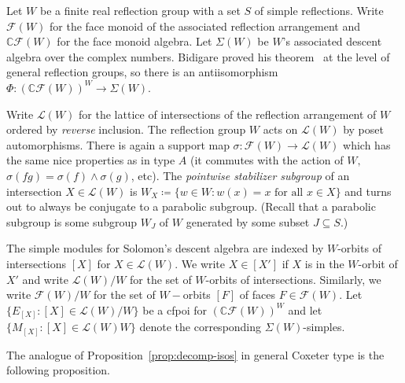 \documentclass[ALCO, Unicode]{cedram}
\def\C{{\mathbb{C}}}
\begin{document}
Let \textbf{$W$} be a finite real reflection group with a set $S$ of simple reflections. Write~\textbf{$\mathcal{F}(W)$} for the face monoid of the associated reflection arrangement and $\C \mathcal{F}(W)$ for the face monoid algebra. Let \textbf{$\Sigma(W)$} be $W$'s associated descent algebra over the complex numbers. Bidigare proved his theorem~\cite[Theorem 3.8.1]{Bidigare} at the level of general reflection groups, so there is an antiisomorphism \textbf{$\Phi: \left(\C \mathcal{F}(W)\right)^W \to \Sigma(W).$} 

 Write \textbf{$\mathcal{L}(W)$} for the lattice of intersections of the reflection arrangement of $W$ ordered by \textit{reverse} inclusion. The reflection group $W$ acts on $\mathcal{L}(W)$ by poset automorphisms. There is again a support map \textbf{$\sigma: \mathcal{F}(W) \to \mathcal{L}(W)$} which has the same nice properties as in type $A$ (it commutes with the action of $W,$ $\sigma(fg)  = \sigma(f) \wedge \sigma(g)$, etc). The \textit{pointwise stabilizer subgroup}  of an intersection $X \in \mathcal{L}(W)$ is \mbox{$W_X \coloneqq  \{w \in W: w(x) = x \text{ for all }x \in X\}$} and turns out to always be conjugate to a parabolic subgroup. (Recall that a parabolic subgroup is some subgroup $W_J$ of $W$ generated by some subset $J \subseteq S.$)
 
 The simple modules for Solomon's descent algebra are indexed by $W$-orbits of intersections $[X]$ for $X \in \mathcal{L}(W).$  We write $X \in [X']$ if $X$ is in the $W$-orbit of $X'$ and write $\mathcal{L}(W) / W$ for the set of $W$-orbits of intersections. Similarly, we write $\mathcal{F}(W) / W$ for the set of $W-$orbits $[F]$ of faces $F \in \mathcal{F}(W).$ Let \textbf{$\{E_{[X]}: [X] \in \mathcal{L}(W) / W\}$} be a cfpoi for $\left(\C\mathcal{F}(W)\right)^W$ and let \textbf{$\{M_{[X]}: [X] \in \mathcal{L}(W)  W\}$} denote the corresponding $\Sigma(W)$-simples.

The analogue of Proposition~\ref{prop:decomp-isos} in general Coxeter type is the following proposition. 
\end{document}
